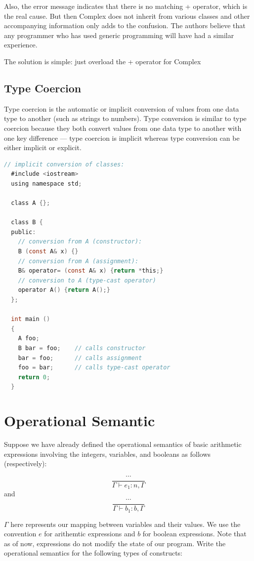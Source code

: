 \documentclass[a4paper]{article}
\theoremstyle{definition}
\begin{document}
Also, the error message indicates that there is no matching + operator, which is the real cause. But then Complex does not inherit from various classes and other accompanying information only adds to the confusion. The authors believe that any programmer who has used generic programming will have had a similar experience.

The solution is simple: just overload the + operator for Complex

\subsection{Type Coercion}
Type coercion is the automatic or implicit conversion of values from one data type to another (such as strings to numbers). Type conversion is similar to type coercion because they both convert values from one data type to another with one key difference — type coercion is implicit whereas type conversion can be either implicit or explicit.

\begin{lstlisting}[language=C]
  // implicit conversion of classes:
  #include <iostream>
  using namespace std;
  
  class A {};
  
  class B {
  public:
    // conversion from A (constructor):
    B (const A& x) {}
    // conversion from A (assignment):
    B& operator= (const A& x) {return *this;}
    // conversion to A (type-cast operator)
    operator A() {return A();}
  };
  
  int main ()
  {
    A foo;
    B bar = foo;    // calls constructor
    bar = foo;      // calls assignment
    foo = bar;      // calls type-cast operator
    return 0;
  }
  \end{lstlisting}
\section{Operational Semantic}
Suppose we have already defined the operational semantics of basic arithmetic expressions involving the integers, variables, and booleans as follows (respectively):

$$\frac{\cdots}{\Gamma \vdash e_{1}: n, \Gamma}$$
and
$$\frac{\cdots}{\Gamma \vdash b_{1}: b, \Gamma}$$

$\Gamma$ here represents our mapping between variables and their values. We use the convention $e$ for arithemtic expressions and $b$ for boolean expressions. Note that as of now, expressions do not modify the state of our program. Write the operational semantics for the following types of constructs:
\end{document}
